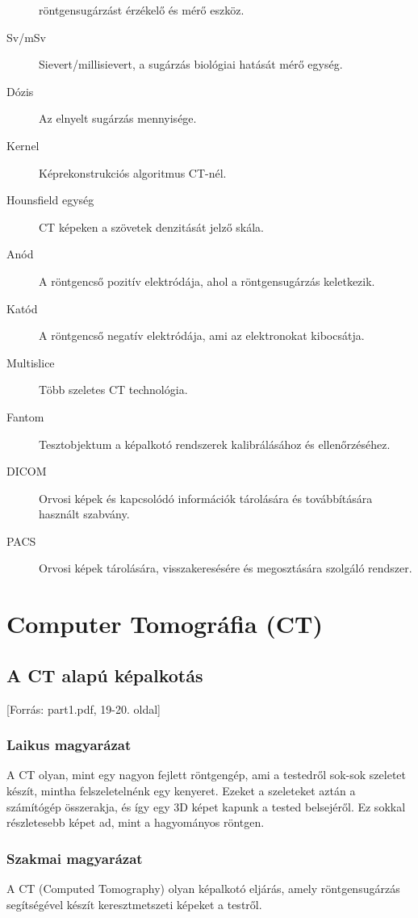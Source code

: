 \documentclass[a4paper,12pt]{article}
\begin{document}
\begin{description}
röntgensugárzást érzékelő és mérő eszköz. \item[Sv/mSv] Sievert/millisievert, a sugárzás biológiai hatását mérő egység. \item[Dózis] Az elnyelt sugárzás mennyisége. \item[Kernel] Képrekonstrukciós algoritmus CT-nél. \item[Hounsfield egység] CT képeken a szövetek denzitását jelző skála. \item[Anód] A röntgencső pozitív elektródája, ahol a röntgensugárzás keletkezik. \item[Katód] A röntgencső negatív elektródája, ami az elektronokat kibocsátja. \item[Multislice] Több szeletes CT technológia. \item[Fantom] Tesztobjektum a képalkotó rendszerek kalibrálásához és ellenőrzéséhez. \item[DICOM] Orvosi képek és kapcsolódó információk tárolására és továbbítására használt szabvány. \item[PACS] Orvosi képek tárolására, visszakeresésére és megosztására szolgáló rendszer.
\end{description}

\section{Computer Tomográfia (CT)}

\subsection{A CT alapú képalkotás} [Forrás: part1.pdf, 19-20. oldal]

\subsubsection{Laikus magyarázat} A CT olyan, mint egy nagyon fejlett röntgengép, ami a testedről sok-sok szeletet készít, mintha felszeletelnénk egy kenyeret. Ezeket a szeleteket aztán a számítógép összerakja, és így egy 3D képet kapunk a tested belsejéről. Ez sokkal részletesebb képet ad, mint a hagyományos röntgen.

\subsubsection{Szakmai magyarázat} A CT (Computed Tomography) olyan képalkotó eljárás, amely röntgensugárzás segítségével készít keresztmetszeti képeket a testről.
\end{document}
